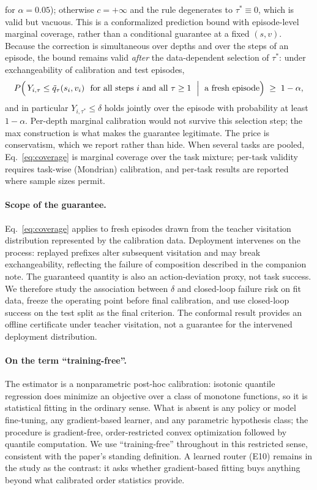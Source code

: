 \documentclass{article}
\begin{document}
\begin{enumerate}[leftmargin=1.5em, itemsep=0.25em, topsep=0.2em]
for $\alpha = 0.05$); otherwise $c = +\infty$ and the rule degenerates to
$\tau^{*} \equiv 0$, which is valid but vacuous. This is a conformalized
prediction bound with episode-level marginal coverage, rather than a
conditional guarantee at a fixed $(s,v)$. Because the correction is
simultaneous over depths and over the steps of an episode, the bound remains
valid \emph{after} the data-dependent selection of $\tau^{*}$: under
exchangeability of calibration and test episodes,
\begin{equation}
P\Bigl( \, Y_{i,\tau} \le \tilde{q}_\tau(s_i, v_i)
\ \ \text{for all steps } i \text{ and all } \tau \ge 1
\ \Bigm|\ \text{a fresh episode} \Bigr) \;\ge\; 1 - \alpha ,
\label{eq:coverage}
\end{equation}
and in particular $Y_{i,\tau^{*}} \le \delta$ holds jointly over the episode
with probability at least $1-\alpha$. Per-depth marginal calibration would
not survive this selection step; the max construction is what makes the
guarantee legitimate. The price is conservatism, which we report rather than
hide. When several tasks are pooled, Eq.~\ref{eq:coverage} is marginal
coverage over the task mixture; per-task validity requires task-wise
(Mondrian) calibration, and per-task results are reported where sample sizes
permit.
\end{enumerate}

\paragraph{Scope of the guarantee.}
Eq.~\ref{eq:coverage} applies to fresh episodes drawn from the teacher
visitation distribution represented by the calibration data. Deployment
intervenes on the process: replayed prefixes alter subsequent visitation and
may break exchangeability, reflecting the failure of composition described in
the companion note. The guaranteed quantity is also an action-deviation proxy,
not task success. We therefore study the association between $\delta$ and
closed-loop failure risk on fit data, freeze the operating point before final
calibration, and use closed-loop success on the test split as the final
criterion. The conformal result provides an offline certificate under teacher
visitation, not a guarantee for the intervened deployment distribution.

\paragraph{On the term ``training-free''.}
The estimator is a nonparametric post-hoc calibration: isotonic quantile
regression does minimize an objective over a class of monotone functions, so
it is statistical fitting in the ordinary sense. What is absent is any
policy or model fine-tuning, any gradient-based learner, and any parametric
hypothesis class; the procedure is gradient-free, order-restricted convex
optimization followed by quantile computation. We use ``training-free''
throughout in this restricted sense, consistent with the paper's standing
definition. A
learned router (E10) remains in the study as the contrast: it asks whether
gradient-based fitting buys anything beyond what calibrated order statistics
provide.
\end{document}
